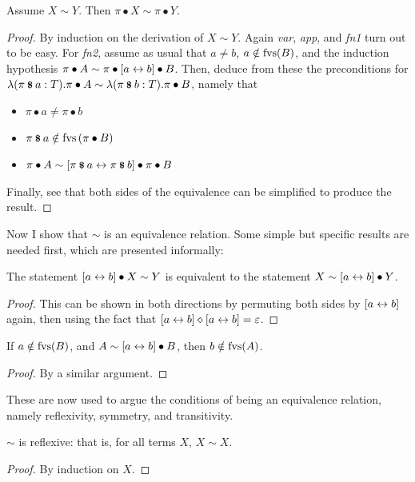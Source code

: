 \begin{lemma}
Assume \(X \sim Y\).
Then \(\pi \bullet X \sim \pi \bullet Y\).
\end{lemma}
\begin{proof}
By induction on the derivation of \(X \sim Y\).
Again \emph{var}, \emph{app}, and \emph{fn1} turn out to be easy.
For \emph{fn2}, assume as usual that \(a \neq b\), \(a \notin \mathrm{fvs}(B)\), and the induction hypothesis \(\pi \bullet A \sim \pi \bullet [a \leftrightarrow b] \bullet B\).
Then, deduce from these the preconditions for \(\lambda (\pi \mathbin{\textrm{\footnotesize{\textbf{\$}}}} a:T). \pi \bullet A \sim \lambda (\pi \mathbin{\textrm{\footnotesize{\textbf{\$}}}} b:T). \pi \bullet B\), namely that
\begin{itemize}
\item
\(\pi \bullet a \neq \pi \bullet b\)
\item
\(\pi \mathbin{\textrm{\footnotesize{\textbf{\$}}}} a \notin \mathrm{fvs}\left(\pi \bullet B\right)\)
\item
\(\pi \bullet A \sim [\pi \mathbin{\textrm{\footnotesize{\textbf{\$}}}} a \leftrightarrow \pi \mathbin{\textrm{\footnotesize{\textbf{\$}}}} b] \bullet \pi \bullet B\)
\end{itemize}
Finally, see that both sides of the equivalence can be simplified to produce the result.
\end{proof}

Now I show that \(\sim\) is an equivalence relation.
Some simple but specific results are needed first, which are presented informally:

\begin{lemma}
\label{lemma:transfer-swapping}
The statement \([a \leftrightarrow b] \bullet X \sim Y\) is equivalent to the statement \(X \sim [a \leftrightarrow b] \bullet Y\).
\end{lemma}
\begin{proof}
This can be shown in both directions by permuting both sides by \([a \leftrightarrow b]\) again, then using the fact that \([a \leftrightarrow b] \diamond [a \leftrightarrow b] = \varepsilon\).
\end{proof}

\begin{lemma}
\label{lemma:transfer-freshness}
If \(a \notin \mathrm{fvs}(B)\), and \(A \sim [a \leftrightarrow b] \bullet B\), then \(b \notin \mathrm{fvs}(A)\).
\end{lemma}
\begin{proof}
By a similar argument.
\end{proof}

These are now used to argue the conditions of being an equivalence relation, namely reflexivity, symmetry, and transitivity.

\begin{lemma}
\(\sim\) is reflexive: that is, for all terms \(X\), \(X \sim X\).
\end{lemma}
\begin{proof}
By induction on \(X\).
\end{proof}

